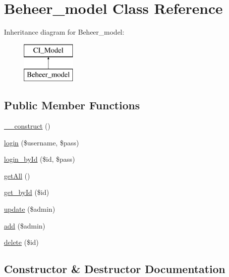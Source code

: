\hypertarget{class_beheer__model}{}\section{Beheer\+\_\+model Class Reference}
\label{class_beheer__model}
Inheritance diagram for Beheer\+\_\+model\+:\begin{figure}[H]
\begin{center}
\leavevmode
\includegraphics[height=2.000000cm]{class_beheer__model}
\end{center}
\end{figure}
\subsection*{Public Member Functions}
\begin{DoxyCompactItemize}
\item 
\mbox{\hyperlink{class_beheer__model_a095c5d389db211932136b53f25f39685}{\+\_\+\+\_\+construct}} ()
\item 
\mbox{\hyperlink{class_beheer__model_aff0ccaed0f67602297ac11a535a53af9}{login}} (\$username, \$pass)
\item 
\mbox{\hyperlink{class_beheer__model_ae1918ad227881de34ca871dca896a623}{login\+\_\+by\+Id}} (\$id, \$pass)
\item 
\mbox{\hyperlink{class_beheer__model_aba0d5b303383fb5b1fabb5fd01cd3800}{get\+All}} ()
\item 
\mbox{\hyperlink{class_beheer__model_a98d28a4d9a29d40c5a8aa0176f19a919}{get\+\_\+by\+Id}} (\$id)
\item 
\mbox{\hyperlink{class_beheer__model_a9b26d258cdfbbf0025a56dbe2f0088b0}{update}} (\$admin)
\item 
\mbox{\hyperlink{class_beheer__model_a9a6cdec5d258d2b51d1a7619909b2a90}{add}} (\$admin)
\item 
\mbox{\hyperlink{class_beheer__model_a2f8258add505482d7f00ea26493a5723}{delete}} (\$id)
\end{DoxyCompactItemize}


\subsection{Constructor \& Destructor Documentation}
\mbox{\label{class_beheer__model_a095c5d389db211932136b53f25f39685}} 
